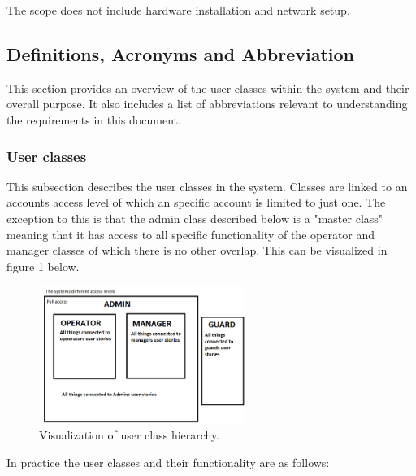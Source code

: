 \documentclass{article}
\begin{document}
The scope does not include hardware installation and network setup. 

\subsection{Definitions, Acronyms and Abbreviation}

This section provides an overview of the user classes within the system and their overall purpose. It also includes a list of abbreviations relevant to understanding the requirements in this document.

\subsubsection{User classes}
This subsection describes the user classes in the system. Classes are linked to an accounts access level of which an specific account is limited to just one. The exception to this is that the admin class described below is a "master class" meaning that it has access to all specific functionality of the operator and manager classes of which there is no other overlap. This can be visualized in figure 1 below.

\begin{figure} [H]
    \centering
    \includegraphics[width=0.6\textwidth]{TDDC88 - User Hierarchy.png}
    \caption{Visualization of user class hierarchy.}
    \label{fig:your_label}
\end{figure}

In practice the user classes and their functionality are as follows: 
\end{document}
